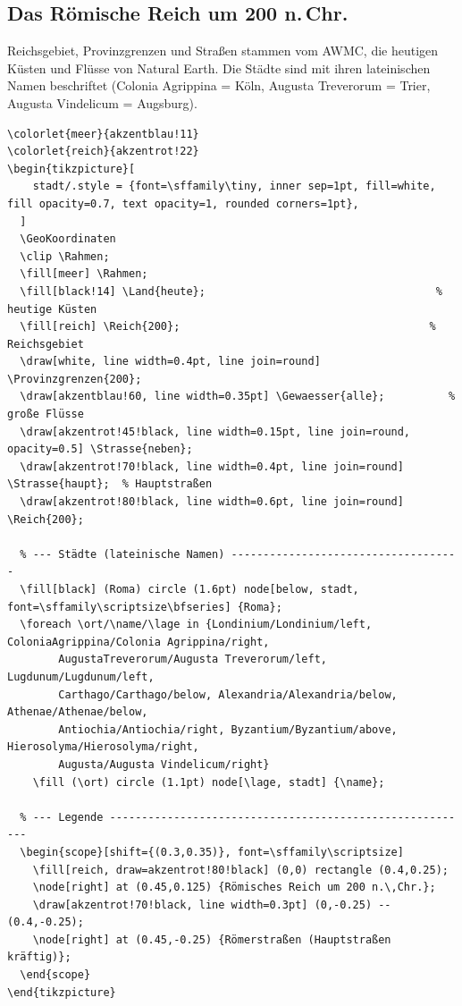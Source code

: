 \subsection{Das Römische Reich um 200 n.\,Chr.}

Reichsgebiet, Provinzgrenzen und Straßen stammen vom AWMC, die heutigen Küsten und Flüsse von Natural Earth. Die Städte sind mit ihren lateinischen Namen beschriftet (Colonia Agrippina = Köln, Augusta Treverorum = Trier, Augusta Vindelicum = Augsburg).

\begin{lstlisting}[style=latex]
% Präambel: 
\colorlet{meer}{akzentblau!11}
\colorlet{reich}{akzentrot!22}
\begin{tikzpicture}[
    stadt/.style = {font=\sffamily\tiny, inner sep=1pt, fill=white, fill opacity=0.7, text opacity=1, rounded corners=1pt},
  ]
  \GeoKoordinaten
  \clip \Rahmen;
  \fill[meer] \Rahmen;
  \fill[black!14] \Land{heute};                                    % heutige Küsten
  \fill[reich] \Reich{200};                                       % Reichsgebiet
  \draw[white, line width=0.4pt, line join=round] \Provinzgrenzen{200};
  \draw[akzentblau!60, line width=0.35pt] \Gewaesser{alle};          % große Flüsse
  \draw[akzentrot!45!black, line width=0.15pt, line join=round, opacity=0.5] \Strasse{neben};
  \draw[akzentrot!70!black, line width=0.4pt, line join=round] \Strasse{haupt};  % Hauptstraßen
  \draw[akzentrot!80!black, line width=0.6pt, line join=round] \Reich{200};

  % --- Städte (lateinische Namen) ------------------------------------
  \fill[black] (Roma) circle (1.6pt) node[below, stadt, font=\sffamily\scriptsize\bfseries] {Roma};
  \foreach \ort/\name/\lage in {Londinium/Londinium/left, ColoniaAgrippina/Colonia Agrippina/right,
        AugustaTreverorum/Augusta Treverorum/left, Lugdunum/Lugdunum/left,
        Carthago/Carthago/below, Alexandria/Alexandria/below, Athenae/Athenae/below,
        Antiochia/Antiochia/right, Byzantium/Byzantium/above, Hierosolyma/Hierosolyma/right,
        Augusta/Augusta Vindelicum/right}
    \fill (\ort) circle (1.1pt) node[\lage, stadt] {\name};

  % --- Legende ---------------------------------------------------------
  \begin{scope}[shift={(0.3,0.35)}, font=\sffamily\scriptsize]
    \fill[reich, draw=akzentrot!80!black] (0,0) rectangle (0.4,0.25);
    \node[right] at (0.45,0.125) {Römisches Reich um 200 n.\,Chr.};
    \draw[akzentrot!70!black, line width=0.3pt] (0,-0.25) -- (0.4,-0.25);
    \node[right] at (0.45,-0.25) {Römerstraßen (Hauptstraßen kräftig)};
  \end{scope}
\end{tikzpicture}
\end{lstlisting}

